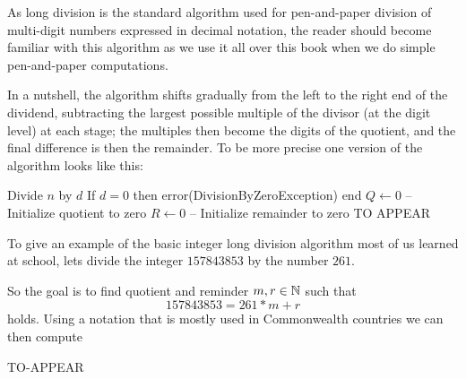 As long division is the standard algorithm used for pen-and-paper division of multi-digit numbers expressed in decimal notation, the reader should become familiar with this algorithm as we use it all over this book when we do simple pen-and-paper computations.

In a nutshell, the algorithm shifts gradually from the left to the right end of the dividend, subtracting the largest possible multiple of the divisor (at the digit level) at each stage; the multiples then become the digits of the quotient, and the final difference is then the remainder. To be more precise one version of the algorithm looks like this:

\begin{algorithmic}
\State Divide $n$ by $d$
\State If $d = 0$ then error(DivisionByZeroException) end
\State $Q \leftarrow 0 $ -- Initialize quotient to zero
\State $R \leftarrow 0 $ -- Initialize remainder to zero               
\State TO APPEAR
\end{algorithmic}

\begin{example} To give an example of the basic integer long division algorithm most of us learned at school, lets divide the integer $157843853$ by the number $261$. 

So the goal is to find quotient and reminder $m,r \in \mathbb{N}$ such that
$$157843853 = 261 * m +r$$
holds. Using a notation that is mostly used in Commonwealth countries we can then compute

TO-APPEAR 
\end{example}



